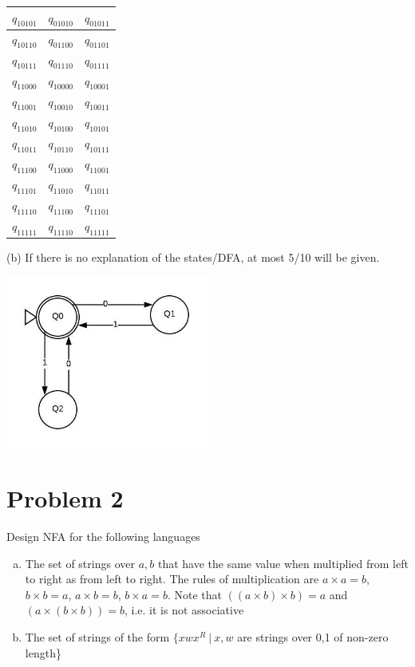 \documentclass{article}
\begin{document}
\begin{longtable}{|c|c|c|}
      $q_{10101}$ & $q_{01010}$ & $q_{01011}$ \\ \hline
      $q_{10110}$ & $q_{01100}$ & $q_{01101}$ \\ \hline
      $q_{10111}$ & $q_{01110}$ & $q_{01111}$ \\ \hline
      $q_{11000}$ & $q_{10000}$ & $q_{10001}$ \\ \hline
      $q_{11001}$ & $q_{10010}$ & $q_{10011}$ \\ \hline
      $q_{11010}$ & $q_{10100}$ & $q_{10101}$ \\ \hline
      $q_{11011}$ & $q_{10110}$ & $q_{10111}$ \\ \hline
      $q_{11100}$ & $q_{11000}$ & $q_{11001}$ \\ \hline
      $q_{11101}$ & $q_{11010}$ & $q_{11011}$ \\ \hline
      $q_{11110}$ & $q_{11100}$ & $q_{11101}$ \\ \hline
      $q_{11111}$ & $q_{11110}$ & $q_{11111}$ \\ \hline
    \end{longtable}
    
    \newpage
    
    (b) If there is no explanation of the states/DFA, at most 5/10 will be given.
    \begin{center}
        \includegraphics[width=0.5\textwidth]{Images/a2-q1-2.jpeg}
    \end{center}
    
    \section*{Problem 2} Design NFA for the following languages
    \begin{enumerate}[(a)]
        \item The set of strings over ${a, b}$ that have the same value when multiplied from left to right as from left to right. The rules of multiplication are $a \times a = b$, $b \times b = a$, $a \times b = b$, $b \times a = b$. Note that $((a \times b) \times b) = a$ and $(a \times (b \times b)) = b$, i.e. it is not associative
        \item The set of strings of the form $\{xwx^R ~|~ x, w$ are strings over 0,1 of non-zero length\}
    \end{enumerate}
    
\end{document}

